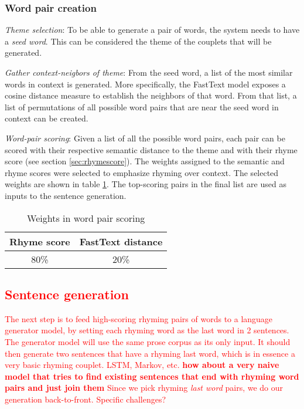 \documentclass[11pt,a4paper]{article}
\newenvironment{tight_enumerate}{
\begin{enumerate}
\setlength{\itemsep}{0pt}
\setlength{\parskip}{0pt}
}{\end{enumerate}}
\begin{document}
\subsubsection{Word pair creation}
\begin{tight_enumerate}
	\item \textit{Theme selection}: To be able to generate a pair of words, the system needs to have a \textit{seed word}. This can be considered the theme of the couplets that will be generated.
	\item \textit{Gather context-neigbors of theme}: From the seed word, a list of the most similar words in context is generated. More specifically, the FastText model exposes a cosine distance measure to establish the neighbors of that word. From that list, a list of permutations of all possible word pairs that are near the seed word in context can be created.
	\item \textit{Word-pair scoring}: Given a list of all the possible word pairs, each pair can be scored with their respective semantic distance to the theme and with their rhyme score (see section \ref{sec:rhymescore}). The weights assigned to the semantic and rhyme scores were selected to emphasize rhyming over context. The selected weights are shown in table \ref{table:weight_wordpair}. The top-scoring pairs in the final list are used as inputs to the sentence generation.
\begin{table}[ht]
\centering
\begin{tabular}{c c}
	\hline\hline
	Rhyme score & FastText distance\\ [0.5ex]
	\hline
	80\% & 20\% \\ [0.5ex]
	\hline
\end{tabular}
\caption{Weights in word pair scoring}
\label{table:weight_wordpair}
\end{table}
\end{tight_enumerate}

\textcolor{red}{
\subsection{Sentence generation}
\label{sec:languagegen}
The next step is to feed high-scoring rhyming pairs of words to a language generator model, by setting each rhyming word as the last word in 2 sentences. The generator model will use the same prose corpus as its only input. It should then generate two sentences that have a rhyming last word, which is in essence a very basic rhyming couplet.
LSTM, Markov, etc.
\textbf{how about a very naive model that tries to find existing sentences that end with rhyming word pairs and just join them}
Since we pick rhyming \textit{last word} pairs, we do our generation back-to-front. Specific challenges?
}
\end{document}
